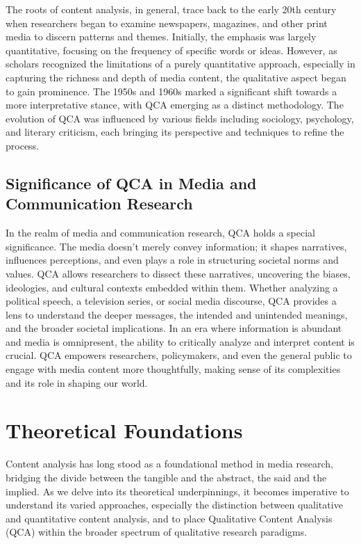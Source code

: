 \documentclass[
  b5paper]{book}
\begin{document}
The roots of content analysis, in general, trace back to the early 20th century when researchers began to examine newspapers, magazines, and other print media to discern patterns and themes. Initially, the emphasis was largely quantitative, focusing on the frequency of specific words or ideas. However, as scholars recognized the limitations of a purely quantitative approach, especially in capturing the richness and depth of media content, the qualitative aspect began to gain prominence. The 1950s and 1960s marked a significant shift towards a more interpretative stance, with QCA emerging as a distinct methodology. The evolution of QCA was influenced by various fields including sociology, psychology, and literary criticism, each bringing its perspective and techniques to refine the process.

\hypertarget{significance-of-qca-in-media-and-communication-research}{%
\subsection*{Significance of QCA in Media and Communication Research}\label{significance-of-qca-in-media-and-communication-research}}

In the realm of media and communication research, QCA holds a special significance. The media doesn't merely convey information; it shapes narratives, influences perceptions, and even plays a role in structuring societal norms and values. QCA allows researchers to dissect these narratives, uncovering the biases, ideologies, and cultural contexts embedded within them. Whether analyzing a political speech, a television series, or social media discourse, QCA provides a lens to understand the deeper messages, the intended and unintended meanings, and the broader societal implications. In an era where information is abundant and media is omnipresent, the ability to critically analyze and interpret content is crucial. QCA empowers researchers, policymakers, and even the general public to engage with media content more thoughtfully, making sense of its complexities and its role in shaping our world.

\hypertarget{theoretical-foundations}{%
\section{Theoretical Foundations}\label{theoretical-foundations}}

Content analysis has long stood as a foundational method in media research, bridging the divide between the tangible and the abstract, the said and the implied. As we delve into its theoretical underpinnings, it becomes imperative to understand its varied approaches, especially the distinction between qualitative and quantitative content analysis, and to place Qualitative Content Analysis (QCA) within the broader spectrum of qualitative research paradigms.
\end{document}
